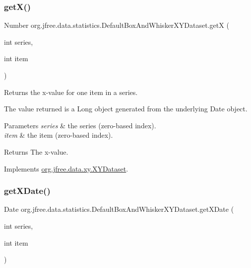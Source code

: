 \subsubsection{\texorpdfstring{get\+X()}{getX()}}
{\footnotesize\ttfamily Number org.\+jfree.\+data.\+statistics.\+Default\+Box\+And\+Whisker\+X\+Y\+Dataset.\+getX (\begin{DoxyParamCaption}\item[{int}]{series,  }\item[{int}]{item }\end{DoxyParamCaption})}

Returns the x-\/value for one item in a series. 

The value returned is a Long object generated from the underlying Date object.


\begin{DoxyParams}{Parameters}
{\em series} & the series (zero-\/based index). \\
\hline
{\em item} & the item (zero-\/based index).\\
\hline
\end{DoxyParams}
\begin{DoxyReturn}{Returns}
The x-\/value. 
\end{DoxyReturn}


Implements \mbox{\hyperlink{interfaceorg_1_1jfree_1_1data_1_1xy_1_1_x_y_dataset_a85c75ba5b69b551e96afd29d1732ba22}{org.\+jfree.\+data.\+xy.\+X\+Y\+Dataset}}.

\mbox{\label{classorg_1_1jfree_1_1data_1_1statistics_1_1_default_box_and_whisker_x_y_dataset_a4ce592cbf0965836deeb816be6e24405}} 
\subsubsection{\texorpdfstring{get\+X\+Date()}{getXDate()}}
{\footnotesize\ttfamily Date org.\+jfree.\+data.\+statistics.\+Default\+Box\+And\+Whisker\+X\+Y\+Dataset.\+get\+X\+Date (\begin{DoxyParamCaption}\item[{int}]{series,  }\item[{int}]{item }\end{DoxyParamCaption})}

